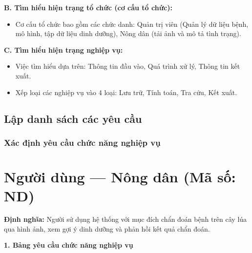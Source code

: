 \documentclass[12pt,a4paper]{article}
\begin{document}
\textbf{B. Tìm hiểu hiện trạng tổ chức (cơ cấu tổ chức):}
\begin{itemize}
    \item Cơ cấu tổ chức bao gồm các chức danh: Quản trị viên (Quản lý dữ liệu bệnh, mô hình, tập dữ liệu dinh dưỡng), Nông dân (tải ảnh và mô tả tình trạng).
\end{itemize}

\textbf{C. Tìm hiểu hiện trạng nghiệp vụ:}
\begin{itemize}
    \item Việc tìm hiểu dựa trên: Thông tin đầu vào, Quá trình xử lý, Thông tin kết xuất.
    \item Xếp loại các nghiệp vụ vào 4 loại: Lưu trữ, Tính toán, Tra cứu, Kết xuất.
\end{itemize}

\hrulefill

\subsection{Lập danh sách các yêu cầu}
\subsubsection{Xác định yêu cầu chức năng nghiệp vụ}

\section{Người dùng --- Nông dân (Mã số: ND)}

\textbf{Định nghĩa:} Người sử dụng hệ thống với mục đích chẩn đoán bệnh trên cây lúa qua hình ảnh, xem gợi ý dinh dưỡng và phản hồi kết quả chẩn đoán.

\vspace{0.3cm}
\textbf{1. Bảng yêu cầu chức năng nghiệp vụ}
\end{document}
